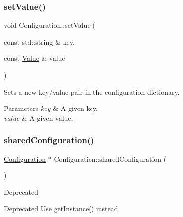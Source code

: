 \subsubsection{\texorpdfstring{set\+Value()}{setValue()}\hspace{0.1cm}{\footnotesize\ttfamily [2/2]}}
{\footnotesize\ttfamily void Configuration\+::set\+Value (\begin{DoxyParamCaption}\item[{const std\+::string \&}]{key,  }\item[{const \hyperlink{classValue}{Value} \&}]{value }\end{DoxyParamCaption})}

Sets a new key/value pair in the configuration dictionary.


\begin{DoxyParams}{Parameters}
{\em key} & A given key. \\
\hline
{\em value} & A given value. \\
\hline
\end{DoxyParams}
\mbox{\label{classConfiguration_a298e51e4fadaa9157a9f8ba2688fb00e}} 
\subsubsection{\texorpdfstring{shared\+Configuration()}{sharedConfiguration()}\hspace{0.1cm}{\footnotesize\ttfamily [1/2]}}
{\footnotesize\ttfamily \hyperlink{classConfiguration}{Configuration} $\ast$ Configuration\+::shared\+Configuration (\begin{DoxyParamCaption}{ }\end{DoxyParamCaption})\hspace{0.3cm}{\ttfamily [static]}}

\begin{DoxyRefDesc}{Deprecated}
\item[\hyperlink{deprecated__deprecated000049}{Deprecated}]Use \hyperlink{classConfiguration_ae327d26e81014cf46b25802478fe9b8e}{get\+Instance()} instead \end{DoxyRefDesc}
\mbox{\label{classConfiguration_a78398b93c54c0505f98efa0ae56dbb6f}} 
